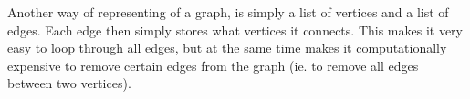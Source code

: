 Another way of representing of a graph, is simply a list of vertices and a list of edges. Each edge then simply stores what vertices it connects. This makes it very easy to loop through all edges, but at the same time makes it computationally expensive to remove certain edges from the graph (ie. to remove all edges between two vertices).

